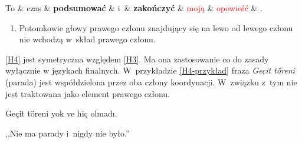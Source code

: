 \begin{exe}
\ex \label{H3-przykład}
\begin{dependency}[baseline=-\the\dimexpr\fontdimen22\textfont2\relax]
\begin{deptext}[column sep=1em]
To \& czas \& \textbf{podsumować} \& i~\& \textbf{zakończyć} \& \textcolor{red}{moją} \& \textcolor{red}{opowieść} \& .  \\ 
\end{deptext}
\end{dependency}
\end{exe}

\begin{enumerate}
\item[\namedlabel{H4}{(H4)}]
Potomkowie głowy prawego członu znajdujący się na lewo od lewego członu nie wchodzą w~skład prawego członu.
\end{enumerate}

\ref{H4} jest symetryczna względem \ref{H3}. Ma ona zastosowanie co do zasady wyłącznie w językach finalnych. W~przykładzie \eqref{H4-przykład} fraza \textit{Geçit töreni} (parada) jest współdzielona przez oba człony koordynacji. W~związku z~tym nie jest traktowana jako element prawego członu.

\begin{exe}
\ex \label{H4-przykład}
Geçit töreni yok ve hiç olmadı.

,,Nie ma parady i~nigdy nie było.''
\citep{turk2019turkish}
\end{exe}

